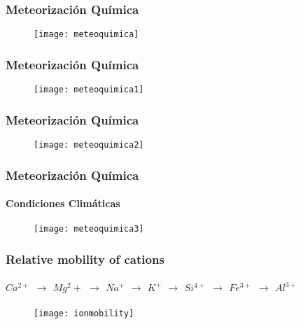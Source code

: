 \documentclass{beamer}
\begin{document}
\begin{frame}
\frametitle{Meteorización Química}
\begin{figure}
\begin{center}
   	\texttt{[image: meteoquimica]}
\end{center}
\end{figure}
\end{frame}
\begin{frame}
\frametitle{Meteorización Química}
\begin{figure}
\begin{center}
   	\texttt{[image: meteoquimica1]}
\end{center}
\end{figure}
\end{frame}
\begin{frame}
\frametitle{Meteorización Química}
\begin{figure}
\begin{center}
   	\texttt{[image: meteoquimica2]}
\end{center}
\end{figure}
\end{frame}
\begin{frame}
\frametitle{Meteorización Química}
\framesubtitle{Condiciones Climáticas}
\begin{figure}
\begin{center}
   	\texttt{[image: meteoquimica3]}
\end{center}
\end{figure}
\end{frame}
\begin{frame}
\frametitle{Relative mobility of cations}
\framesubtitle{$Ca^{2+}$  $\rightarrow$  $Mg{^2+}$  $\rightarrow$  $Na^+$  $\rightarrow$  $K^+$ $\rightarrow$  $Si^{4+}$  $\rightarrow$ $Fe^{3+}$  $\rightarrow$  $Al^{3+}$ }
\begin{figure}
\begin{center}
   	\texttt{[image: ionmobility]}
\end{center}
\end{figure}
\end{frame}
\end{document}
